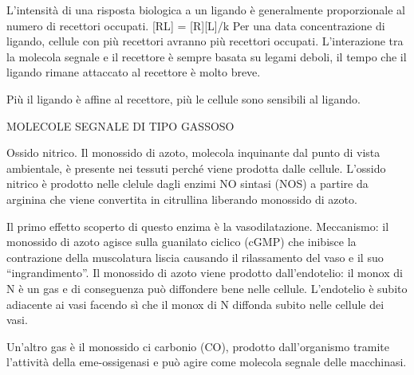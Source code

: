 \documentclass[]{article}
\begin{document}
L'intensità di una risposta biologica a un ligando è generalmente
proporzionale al numero di recettori occupati. {[}RL{]} =
{[}R{]}{[}L{]}/k Per una data concentrazione di ligando, cellule con più
recettori avranno più recettori occupati. L'interazione tra la molecola
segnale e il recettore è sempre basata su legami deboli, il tempo che il
ligando rimane attaccato al recettore è molto breve.

Più il ligando è affine al recettore, più le cellule sono sensibili al
ligando.

MOLECOLE SEGNALE DI TIPO GASSOSO

Ossido nitrico. Il monossido di azoto, molecola inquinante dal punto di
vista ambientale, è presente nei tessuti perché viene prodotta dalle
cellule. L'ossido nitrico è prodotto nelle clelule dagli enzimi NO
sintasi (NOS) a partire da arginina che viene convertita in citrullina
liberando monossido di azoto.

Il primo effetto scoperto di questo enzima è la vasodilatazione.
Meccanismo: il monossido di azoto agisce sulla guanilato ciclico (cGMP)
che inibisce la contrazione della muscolatura liscia causando il
rilassamento del vaso e il suo ``ingrandimento''. Il monossido di azoto
viene prodotto dall'endotelio: il monox di N è un gas e di conseguenza
può diffondere bene nelle cellule. L'endotelio è subito adiacente ai
vasi facendo sì che il monox di N diffonda subito nelle cellule dei
vasi.

Un'altro gas è il monossido ci carbonio (CO), prodotto dall'organismo
tramite l'attività della eme-ossigenasi e può agire come molecola
segnale delle macchinasi.
\end{document}
